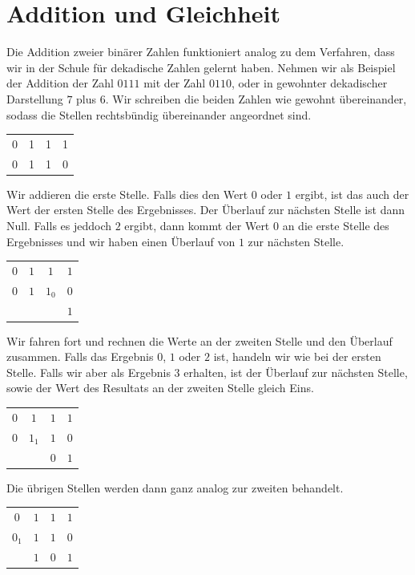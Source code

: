 \documentclass[11pt,a4paper,leqno]{report}
\numberwithin{equation}{chapter}
\begin{document}
\section{Addition und Gleichheit}
Die Addition zweier bin\"arer Zahlen funktioniert analog zu dem Verfahren, dass wir in der Schule f\"ur dekadische Zahlen gelernt haben. Nehmen wir als Beispiel der Addition der Zahl $0111$ mit der Zahl $0110$, oder in gewohnter dekadischer Darstellung $7$ plus $6$.
Wir schreiben die beiden Zahlen wie gewohnt \"ubereinander, sodass die Stellen rechtsb\"undig \"ubereinander angeordnet sind.
\begin{center}
	\begin{tabular}{c c c c}
		0 & 1 & 1 & 1\\
		0 & 1 & 1 & 0\\
		\hline
	\end{tabular}  
\end{center}
Wir addieren die erste Stelle. Falls dies den Wert $0$ oder $1$ ergibt, ist das auch der Wert der ersten Stelle des Ergebnisses. Der \"Uberlauf zur n\"achsten Stelle ist dann Null. Falls es jeddoch $2$ ergibt, dann kommt der Wert $0$ an die erste Stelle des Ergebnisses und wir haben einen \"Uberlauf von $1$ zur n\"achsten Stelle.  
\begin{center}
	\begin{tabular}{c c c c}
		$0$ & $1$ & $1$ & $1$\\
		$0$ & $1$ & $1_0$ & $0$\\
		\hline
		 & &  & $1$\\
	\end{tabular}  
\end{center}
Wir fahren fort und rechnen die Werte an der zweiten Stelle und den \"Uberlauf zusammen. Falls das Ergebnis $0$, $1$ oder $2$ ist, handeln wir wie bei der ersten Stelle. Falls wir aber als Ergebnis $3$ erhalten, ist der \"Uberlauf zur n\"achsten Stelle, sowie der Wert des Resultats an der zweiten Stelle gleich Eins.  
\begin{center}
	\begin{tabular}{c c c c}
		$0$ & $1$ & $1$ & $1$\\
		$0$ & $1_1$ & $1$ & $0$\\
		\hline
		& & $0$ & $1$\\
	\end{tabular}  
\end{center}
Die \"ubrigen Stellen werden dann ganz analog zur zweiten behandelt.
\begin{center}
	\begin{tabular}{c c c c}
		$0$ & $1$ & $1$ & $1$\\
		$0_1$ & $1$ & $1$ & $0$\\
		\hline
		& $1$ & $0$ & $1$\\
	\end{tabular}  
\end{center}
\end{document}
